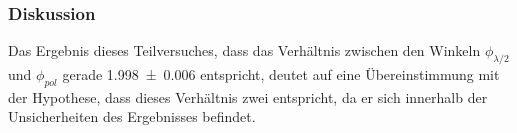 	\subsubsection*{Diskussion}
	
		Das Ergebnis dieses Teilversuches, dass das Verhältnis zwischen den Winkeln $\phi_{\lambda/2}$ und $\phi_{pol}$ gerade \SI{1,998+-0,006}{} entspricht, deutet auf eine Übereinstimmung mit der Hypothese, dass dieses Verhältnis zwei entspricht, da er sich innerhalb der Unsicherheiten des Ergebnisses befindet.
		
